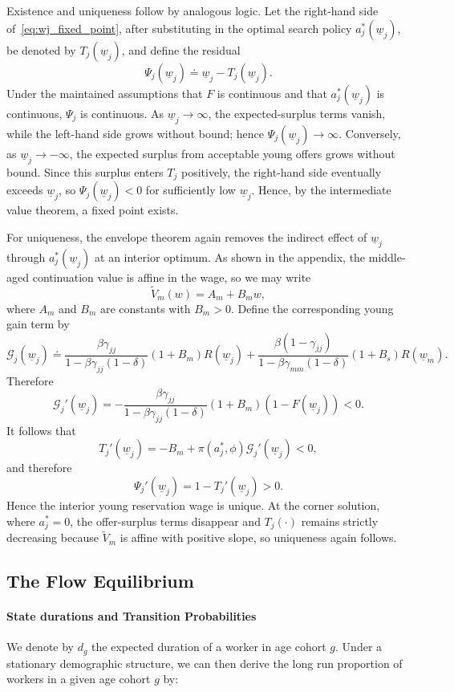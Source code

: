 \documentclass{article}
\newcommand{\lbar}[1]{\underline{#1}} %
\begin{document}
Existence and uniqueness follow by analogous logic. Let the right-hand side of~\eqref{eq:wj_fixed_point}, after substituting in the optimal search policy $a_j^*(\lbar w_j)$, be denoted by $T_j(\lbar w_j)$, and define the residual
\[
\Psi_j(\lbar w_j)\doteq \lbar w_j-T_j(\lbar w_j).
\]
Under the maintained assumptions that $F$ is continuous and that $a_j^*(\lbar w_j)$ is continuous, $\Psi_j$ is continuous. As $\lbar w_j\to\infty$, the expected-surplus terms vanish, while the left-hand side grows without bound; hence $\Psi_j(\lbar w_j)\to\infty$. Conversely, as $\lbar w_j\to-\infty$, the expected surplus from acceptable young offers grows without bound. Since this surplus enters $T_j$ positively, the right-hand side eventually exceeds $\lbar w_j$, so $\Psi_j(\lbar w_j)<0$ for sufficiently low $\lbar w_j$. Hence, by the intermediate value theorem, a fixed point exists.

For uniqueness, the envelope theorem again removes the indirect effect of $\lbar w_j$ through $a_j^*(\lbar w_j)$ at an interior optimum. As shown in the appendix, the middle-aged continuation value is affine in the wage, so we may write
\[
\tilde V_m(w)=A_m+B_mw,
\]
where $A_m$ and $B_m$ are constants with $B_m>0$. Define the corresponding young gain term by
\[
\mathcal G_j(\lbar w_j)
\doteq
\frac{\beta\gamma_{jj}}{1-\beta\gamma_{jj}(1-\delta)}
(1+B_m)R(\lbar w_j)
+
\frac{\beta(1-\gamma_{jj})}{1-\beta\gamma_{mm}(1-\delta)}
(1+B_s)R(\lbar w_m).
\]
Therefore
\[
\mathcal G_j'(\lbar w_j)
=
-\frac{\beta\gamma_{jj}}{1-\beta\gamma_{jj}(1-\delta)}
(1+B_m)(1-F(\lbar w_j))
<0.
\]
It follows that
\[
T_j'(\lbar w_j)
=
-B_m+\pi(a_j^*,\phi)\mathcal G_j'(\lbar w_j)
<0,
\]
and therefore
\[
\Psi_j'(\lbar w_j)=1-T_j'(\lbar w_j)>0.
\]
Hence the interior young reservation wage is unique. At the corner solution, where $a_j^*=0$, the offer-surplus terms disappear and $T_j(\cdot)$ remains strictly decreasing because $\tilde V_m$ is affine with positive slope, so uniqueness again follows.

\subsection{The Flow Equilibrium}

\paragraph{State durations and Transition Probabilities}
We denote by $d_g$ the expected duration of a worker in age cohort $g$. Under a stationary demographic structure, we can then derive the long run proportion of workers in a given age cohort $g$ by:
\end{document}
